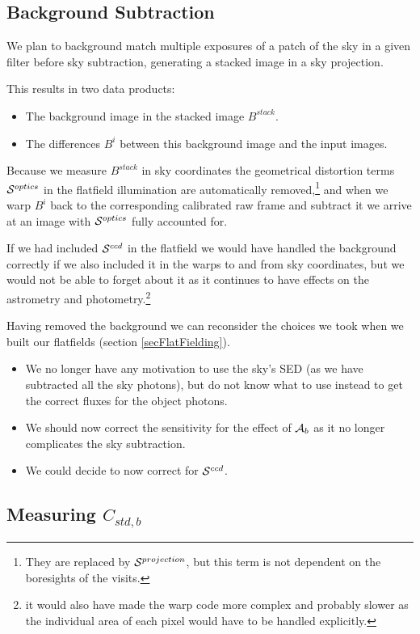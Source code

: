 \documentclass[12pt]{article}
\newcommand{\additive}{{\cal A}}
\newcommand{\qe}{{\cal S}}
\begin{document}
\subsection{Background Subtraction}

We plan to background match multiple exposures of a patch of the sky in a given filter before sky subtraction,
generating a stacked image in a sky projection.

This results in two data products:
\begin{itemize}
\item The background image in the stacked image $B^{stack}$.
\item The differences $B^i$ between this background image and the input images.
\end{itemize}
Because we measure $B^{stack}$ in sky coordinates the geometrical distortion terms $\qe^{optics}$ in
the flatfield illumination are automatically removed,\footnote{They are replaced by $\qe^{projection}$,
  but this term is not dependent on the boresights of the visits.}
and when we warp $B^i$ back to the corresponding
calibrated raw frame and subtract it we arrive at an image with $\qe^{optics}$ fully accounted for.

If we had included $\qe^{ccd}$ in the flatfield we would have handled the background correctly if we also
included it in the warps to and from sky coordinates, but we would not be able to forget about it as it
continues to have effects on the astrometry and photometry.\footnote{ it would also have made the warp code
  more complex and probably slower as the individual area of each pixel would have to be handled explicitly.
}

Having removed the background we can reconsider the choices we took when we built our flatfields
(section \ref{secFlatFielding}).
\begin{itemize}
   \item We no longer have any motivation to use the sky's SED (as we have subtracted all the sky photons),
     but do not know what to use instead to get the correct fluxes for the object photons.
   \item We should now correct the sensitivity for the effect of $\additive_b$ as it no longer complicates
     the sky subtraction.
   \item We could decide to now correct for $\qe^{ccd}$.
\end{itemize}

\subsection{Measuring \texorpdfstring{$C_{std, b}$}{Cstd}}
\end{document}
